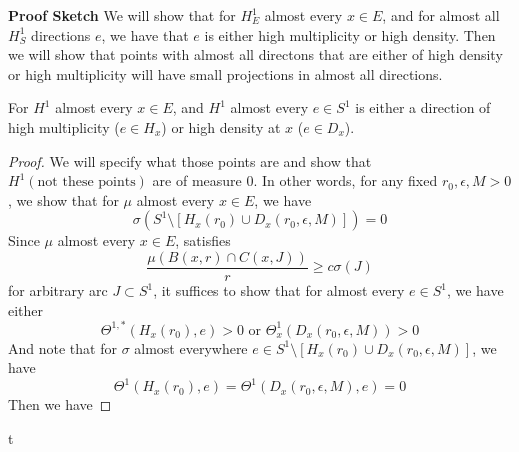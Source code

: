 \begin{note}
    \textbf{Proof Sketch} We will show that for $H^1_E$ almost every $x\in E$, and for almost all  $H^1_S$ directions $e$, we have that $e$ is either high multiplicity or high density. Then we will show that points with almost all directons that are either of high density or high multiplicity will have small projections in almost all directions.
\end{note}

\begin{lemma}
    For $H^1$ almost every $x\in E$, and $H^1$ almost every $e\in S^1$ is either a direction of high multiplicity ($e\in H_x$) or high density at $x$ ($e\in D_x$).
\end{lemma}
\begin{proof}
    We will specify what those points are and show that $H^1(\text{not these points})$ are of measure 0. In other words, for any fixed $r_0, \epsilon, M>0$, we show that for $\mu$ almost every $x\in E$, we have
    \begin{equation*}
        \sigma(S^1\setminus[H_x(r_0)\cup D_x(r_0, \epsilon, M)])=0
    \end{equation*}
    Since $\mu$ almost every $x\in E$, satisfies 
    \begin{equation*}
        \frac{\mu(B(x,r)\cap C(x,J))}{r}\geq c\sigma(J)
    \end{equation*}
    for arbitrary arc $J\subset S^1$, it suffices to show that for almost every $e\in S^1$, we have either
    \begin{equation*}
        \Theta^{1,*}(H_x(r_0), e)>0 \text{ or  } \Theta_x^1(D_x(r_0, \epsilon, M))>0
    \end{equation*}
    And note that for $\sigma$ almost  everywhere $e\in S^1\setminus [H_x(r_0)\cup D_x(r_0, \epsilon, M)]$, we have
    \begin{equation*}
        \Theta^{1}(H_x(r_0), e)=\Theta^1(D_x(r_0, \epsilon, M), e)=0
    \end{equation*}
    Then we have 
\end{proof}

t